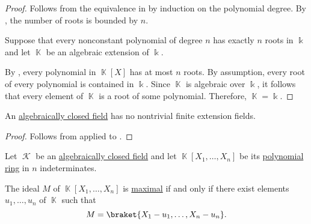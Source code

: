 \begin{proof}
   Follows from the equivalence in  by induction on the polynomial degree. By , the number of roots is bounded by \( n \).

   Suppose that every nonconstant polynomial of degree \( n \) has exactly \( n \) roots in \( \Bbbk \) and let \( \BbbK \) be an algebraic extension of \( \Bbbk \).

  By , every polynomial in \( \BbbK[X] \) has at most \( n \) roots. By assumption, every root of every polynomial is contained in \( \Bbbk \). Since \( \BbbK \) is algebraic over \( \Bbbk \), it follows that every element of \( \BbbK \) is a root of some polynomial. Therefore, \( \BbbK = \Bbbk \).
\end{proof}

\begin{proposition}\label{thm:no_finite_extensions_of_closed_fields}
  An \hyperref[def:algebraically_closed_field]{algebraically closed field} has no nontrivial finite extension fields.
\end{proposition}
\begin{proof}
  Follows from  applied to .
\end{proof}

\begin{theorem}\label{thm:weak_nullstellensatz}
  Let \( \mscrK \) be an \hyperref[def:algebraically_closed_field]{algebraically closed field} and let \( \BbbK[X_1, \ldots, X_n] \) be its \hyperref[def:polynomial_semiring]{polynomial ring} in \( n \) indeterminates.

  The ideal \( M \) of \( \BbbK[X_1, \ldots, X_n] \) is \hyperref[def:semiring_ideal/maximal]{maximal} if and only if there exist elements \( u_1, \ldots, u_n \) of \( \BbbK \) such that
  \begin{equation*}
    M = \braket{ X_1 - u_1, \ldots, X_n - u_n }.
  \end{equation*}
\end{theorem}
